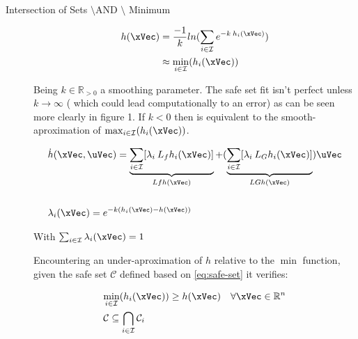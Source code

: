 \begin{description}

    \item[Intersection of Sets \(\setminus\)AND \(\setminus\) Minimum]

    \begin{align}
        h(\xVec) &= \frac{-1}{k}ln(\sum_{i \in \mathcal{I}} e^{-k \hspace{0.2em} h_i(\xVec)}) 
        \label{eq:Min_smoothFunc} \\
                 &\approx \underset{i \in \mathcal{I}}{\min} (h_i(\xVec))
        \notag  
    \end{align}

    Being  \(k \in \mathbb{R}_{>0}\) a smoothing parameter. The safe set fit isn't perfect unless \(k \to \infty\) ( which could lead computationally to an error) as can be seen more clearly in \cite{molnar2023composing} figure 1. If \(k<0\) then is equivalent to the smooth-aproximation of \(\max_{i \in \mathcal{I}}(h_i(\xVec))\). 

    \begin{subequations}
        \begin{align}
            &\dot{h}(\xVec , \uVec) = \underbrace{\sum_{i \in \mathcal{I}} [\lambda_i \hspace{0.2em} L_fh_i(\xVec)]}_{Lfh(\xVec)} + (\underbrace{\sum_{i \in \mathcal{I}} [\lambda_i \hspace{0.2em} L_Gh_i(\xVec)]}_{LGh(\xVec)})\uVec 
            \label{eq:Min_smooth_derivative} \\ \notag \\
            &\lambda_i(\xVec) = e^{-k(h_i(\xVec)-h(\xVec))}
            \label{eq:Min_lambda_smoothFunc}
        \end{align}
    \end{subequations}

    With \(\sum_{i \in \mathcal{I}} \lambda_i(\xVec) = 1\) \par
    Encountering an under-aproximation of \(h\) relative to the \(\min\) function, given the safe set \(\mathcal{C}\) defined based on \ref{eq:safe-set} it verifies:

    \begin{subequations}
        \begin{align}
            &\underset{i \in \mathcal{I}}{\min} (h_i(\xVec)) \geq h(\xVec) \quad \forall \xVec \in \mathbb{R}^n 
            \label{eq:Intersection_CBF_Comparation} \\
            &\mathcal{C} \subseteq \bigcap_{i \in \mathcal{I}} \mathcal{C}_i
            \label{eq:Intersection_SafeSet_Comparation}
        \end{align}
    \end{subequations}


\end{description}
